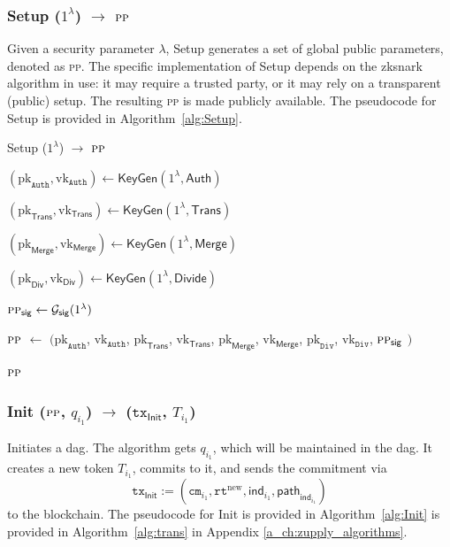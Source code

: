 \subsubsection{\textsf{Setup} ($1^{\lambda}$) $\rightarrow$ $\textsc{pp}$}
Given a security parameter $\lambda$, \textsf{Setup} generates a set of global public parameters, denoted as \textsc{pp}. The specific implementation of \textsf{Setup} depends on the \gls{zksnark} algorithm in use: it may require a trusted party, or it may rely on a transparent (public) setup. The resulting \textsc{pp} is made publicly available. The pseudocode for \textsf{Setup} is provided in Algorithm~\ref{alg:Setup}.

\begin{algorithm}[h]
\caption{\textsf{Setup} ($1^{\lambda}$) $\rightarrow$ $\textsc{pp}$ }\label{alg:Setup}
\begin{algorithmic}

\State $(\text{pk}_\texttt{Auth}, \text{vk}_\texttt{Auth}) \leftarrow \textsf{KeyGen}(1^{\lambda}, \mathsf{Auth})$ 

\State $(\text{pk}_\textsf{Trans}, \text{vk}_\textsf{Trans}) \leftarrow \textsf{KeyGen}(1^{\lambda}, \mathsf{Trans})$ 

\State $(\text{pk}_\textsf{Merge}, \text{vk}_\textsf{Merge}) \leftarrow \textsf{KeyGen}(1^{\lambda}, \mathsf{Merge})$ 

\State $(\text{pk}_\textsf{Div}, \text{vk}_\textsf{Div}) \leftarrow \textsf{KeyGen}(1^{\lambda}, \mathsf{Divide})$ 

\State $\textsc{pp}_\mathsf{sig} \leftarrow \mathcal{G}_\mathsf{sig}(1^{\lambda})$


\State $\textsc{pp}$ $\leftarrow$ $($$\text{pk}_\texttt{Auth}$, $\text{vk}_\texttt{Auth}$, $\text{pk}_\textsf{Trans}$, $\text{vk}_\textsf{Trans}$, $\text{pk}_\textsf{Merge}$, $\text{vk}_\textsf{Merge}$, $\text{pk}_\texttt{Div}$, $\text{vk}_\texttt{Div}$, $\textsc{pp}_\mathsf{sig}$ $)$

\State \Return $\textsc{pp}$

\end{algorithmic}
\end{algorithm}


\subsubsection{\textsf{Init} ($\textsc{pp}$, $q_{i_1}$) $\rightarrow$ ($\texttt{tx}_{\textsf{Init}}$, $T_{i_1}$) }
Initiates a \gls{dag}. The algorithm gets $q_{i_1}$, which will be maintained in the \gls{dag}. It creates a new token $T_{i_1}$, commits to it, and sends the commitment via
 \[
 \texttt{tx}_{\mathsf{Init}} := (\texttt{cm}_{i_1}, \texttt{rt}^{\text{new}}, \mathsf{ind}_{i_1}, \mathsf{path}_{\mathsf{ind}_{i_1}})
 \]
 to the blockchain. The pseudocode for \textsf{Init} is provided in Algorithm~\ref{alg:Init} is provided in Algorithm~\ref{alg:trans} in Appendix \ref{a_ch:zupply_algorithms}.



